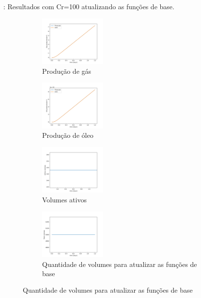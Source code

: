 \documentclass[professionalfont]{beamer}
\begin{document}
\begin{frame}{\FrameProblemName: {\small Resultados com Cr=100 atualizando as funções de base.}}
    \begin{figure}[!ht]
        \centering
        \begin{subfigure}{.48\textwidth}
            \centering
            \includegraphics[height=2.5cm]{./imgs/pr2/3k_5000x1x1/cr 100/3k_5000_cr100_update/svgtopng/figura_case-finescale_3k_5000_CR100_updateGas_production.png}
            \caption{Produção de gás}
        \end{subfigure}
        \hfill
        \begin{subfigure}{.48\textwidth}
            \centering
            \includegraphics[height=2.5cm]{./imgs/pr2/3k_5000x1x1/cr 100/3k_5000_cr100_update/svgtopng/figura_case-finescale_3k_5000_CR100_updateOil_production.png}
            \caption{Produção de óleo}
        \end{subfigure}
        \bigskip
        \begin{subfigure}{.48\textwidth}
            \centering
            \includegraphics[height=2.5cm]{./imgs/pr2/3k_5000x1x1/cr 100/3k_5000_cr100_update/svgtopng/figura_case-finescale_3k_5000_CR100_updateActive_volumes.png}
            \caption{Volumes ativos}
        \end{subfigure}
        \hfill
        \begin{subfigure}{.48\textwidth}
            \centering
            \includegraphics[height=2.5cm]{./imgs/pr2/3k_5000x1x1/cr 100/3k_5000_cr100_update/svgtopng/figura_case-finescale_3k_5000_CR100_updateTotal volumes.png}
            \caption{Quantidade de volumes para atualizar as funções de base}
        \end{subfigure}
        \label{fig:fig8_pr2-cr100}
        
    \end{figure}
\end{frame}
\end{document}
